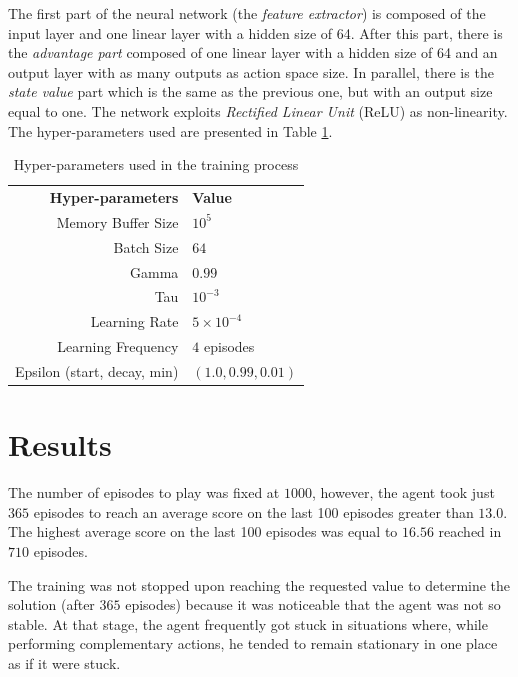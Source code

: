 \documentclass[letterpaper]{article}
\begin{document}
The first part of the neural network (the \textit{feature extractor}) is composed of the input layer and one linear layer with a hidden size of 64. After this part, there is the \textit{advantage part} composed of one linear layer with a hidden size of 64 and an output layer with as many outputs as action space size. In parallel, there is the \textit{state value} part which is the same as the previous one, but with an output size equal to one. The network exploits \textit{Rectified Linear Unit} (ReLU) as non-linearity. The hyper-parameters used are presented in Table \ref{table:hp}. 

\begin{table}[]
\begin{tabular}{rl}
\textbf{Hyper-parameters}    & \textbf{Value}        \\
Memory Buffer Size          & $10^5$ \\
Batch Size                  & $64$                    \\
Gamma                       & $0.99$                  \\
Tau                         & $10^{-3}$                 \\
Learning Rate               & $5\times 10^{-4}$                  \\
Learning Frequency          & $4$ episodes            \\
Epsilon (start, decay, min) & $(1.0,0.99,0.01)$      
\end{tabular}
\caption{Hyper-parameters used in the training process}
\label{table:hp}
\end{table}

\section{Results}

The number of episodes to play was fixed at $1000$, however, the agent took just $365$ episodes to reach an average score on the last 100 episodes greater than $13.0$. The highest average score on the last 100 episodes was equal to $16.56$ reached in $710$ episodes.

The training was not stopped upon reaching the requested value to determine the solution (after $365$ episodes) because it was noticeable that the agent was not so stable. At that stage, the agent frequently got stuck in situations where, while performing complementary actions, he tended to remain stationary in one place as if it were stuck.
\end{document}
